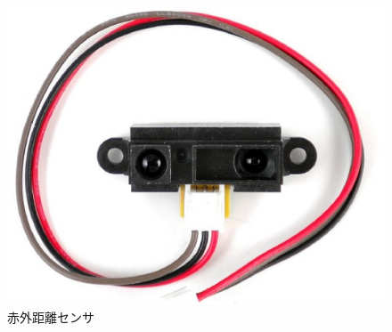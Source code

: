 \documentclass[11pt,a4paper]{jarticle}
\begin{document}
\begin{figure}[htbp]
 \begin{minipage}{0.5\columnwidth}
  \centering
  \includegraphics[width=\columnwidth]{img/DistanceDetector.eps}
  \caption{赤外距離センサ}
  \label{distance}
 \end{minipage}
 \end{figure}
 
 
\end{document}
